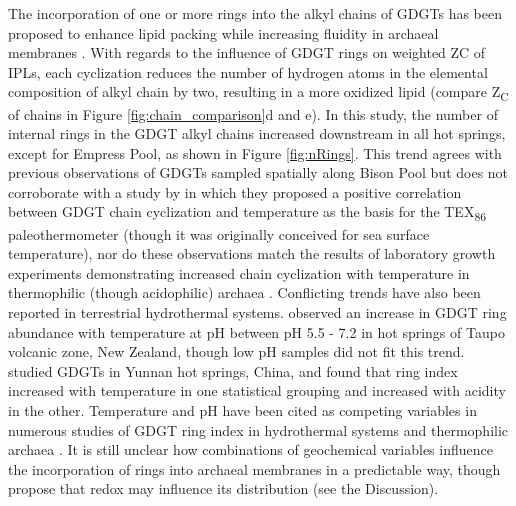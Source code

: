 The incorporation of one or more rings into the alkyl chains of GDGTs has been proposed to enhance lipid packing while increasing fluidity in archaeal membranes \citep{sollich2017heat}. With regards to the influence of GDGT rings on weighted ZC of IPLs, each cyclization reduces the number of hydrogen atoms in the elemental composition of alkyl chain by two, resulting in a more oxidized lipid (compare Z\textsubscript{C} of chains in Figure \ref{fig:chain_comparison}d and e). In this study, the number of internal rings in the GDGT alkyl chains increased downstream in all hot springs, except for Empress Pool, as shown in Figure \ref{fig:nRings}. This trend agrees with previous observations of GDGTs sampled spatially along Bison Pool \citep{schubotz2013spatial} but does not corroborate with a study by \cite{schouten2002distributional} in which they proposed a positive correlation between GDGT chain cyclization and temperature as the basis for the TEX\textsubscript{86} paleothermometer (though it was originally conceived for sea surface temperature), nor do these observations match the results of laboratory growth experiments demonstrating increased chain cyclization with temperature in thermophilic (though acidophilic) archaea \citep{boyd2011temperature}. Conflicting trends have also been reported in terrestrial hydrothermal systems. \cite{kaur2015temperature} observed an increase in GDGT ring abundance with temperature at pH between pH 5.5 - 7.2 in hot springs of Taupo volcanic zone, New Zealand, though low pH samples did not fit this trend. \cite{wu2013impacts} studied GDGTs in Yunnan hot springs, China, and found that ring index increased with temperature in one statistical grouping and increased with acidity in the other. Temperature and pH have been cited as competing variables in numerous studies of GDGT ring index in hydrothermal systems and thermophilic archaea \citep{boyd2013role, pearson2008factors, boyd2011temperature}. It is still unclear how combinations of geochemical variables influence the incorporation of rings into archaeal membranes in a predictable way, though propose that redox may influence its distribution (see the Discussion).





